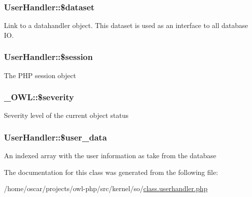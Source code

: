 \subsubsection[{\$dataset}]{\setlength{\rightskip}{0pt plus 5cm}UserHandler::\$dataset}\label{classUserHandler_ac38c1ea50b2820ed03781bdbe8eb2e08}
Link to a datahandler object. This dataset is used as an interface to all database IO. 
\subsubsection[{\$session}]{\setlength{\rightskip}{0pt plus 5cm}UserHandler::\$session}\label{classUserHandler_af097b7fd1ee085b46a6c34e071508a7f}
The PHP session object 
\subsubsection[{\$severity}]{\setlength{\rightskip}{0pt plus 5cm}\_\-OWL::\$severity}\label{class__OWL_ad26b40a9dbbacb33e299b17826f8327c}
Severity level of the current object status 
\subsubsection[{\$user\_\-data}]{\setlength{\rightskip}{0pt plus 5cm}UserHandler::\$user\_\-data}\label{classUserHandler_ae7a2d59eee65560ac96b860e828bb445}
An indexed array with the user information as take from the database 

The documentation for this class was generated from the following file:\begin{DoxyCompactItemize}
\item 
/home/oscar/projects/owl-\/php/src/kernel/so/\hyperlink{class_8userhandler_8php}{class.userhandler.php}\end{DoxyCompactItemize}

